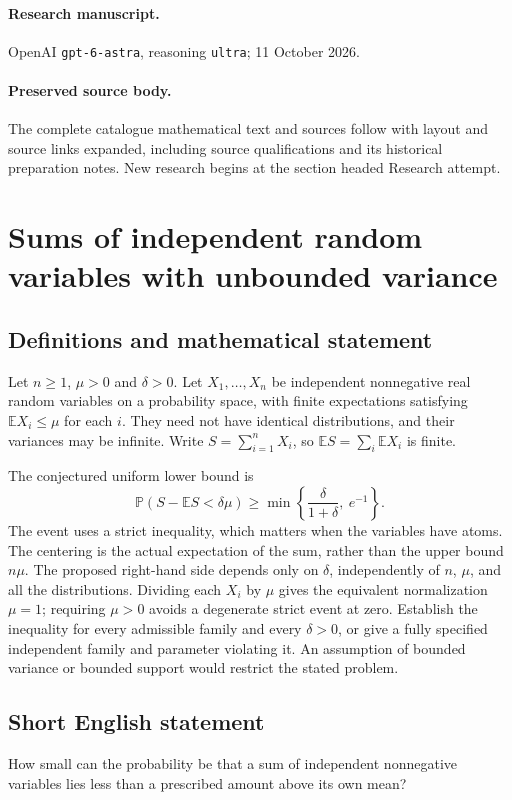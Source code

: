\documentclass[11pt,a4paper]{article}
\begin{document}
\paragraph{Research manuscript.} OpenAI \texttt{gpt-6-astra}, reasoning \texttt{ultra}; 11 October 2026.
\paragraph{Preserved source body.} The complete catalogue mathematical text and sources follow with layout and source links expanded, including source qualifications and its historical preparation notes. New research begins at the section headed Research attempt.

\section*{Sums of independent random variables with unbounded variance}\label{statement}

\subsection{Definitions and mathematical statement}
Let $n\ge1$, $\mu>0$ and $\delta>0$. Let $X_1,\ldots,X_n$ be
independent nonnegative real random variables on a probability space,
with finite expectations satisfying $\mathbb E X_i\le\mu$ for each
$i$. They need not have identical distributions, and their variances
may be infinite. Write $S=\sum_{i=1}^n X_i$, so
$\mathbb E S=\sum_i\mathbb E X_i$ is finite.

The conjectured uniform lower bound is
\[
 \mathbb P(S-\mathbb E S<\delta\mu)
            \ge \min\left\{\frac{\delta}{1+\delta},\ e^{-1}\right\}.
\]
The event uses a strict inequality, which matters when the variables
have atoms. The centering is the actual expectation of the sum,
rather than the upper bound $n\mu$. The proposed right-hand side
depends only on $\delta$, independently of $n$, $\mu$, and all
the distributions. Dividing each $X_i$ by $\mu$ gives the equivalent
normalization $\mu=1$; requiring $\mu>0$ avoids a degenerate strict
event at zero.
Establish the inequality for every admissible family and every
$\delta>0$, or give a fully specified independent family and
parameter violating it. An assumption of bounded variance or
bounded support would restrict the stated problem.
\subsection{Short English statement}
How small can the probability be that a sum of independent nonnegative variables lies less than a prescribed amount above its own mean?
\end{document}
